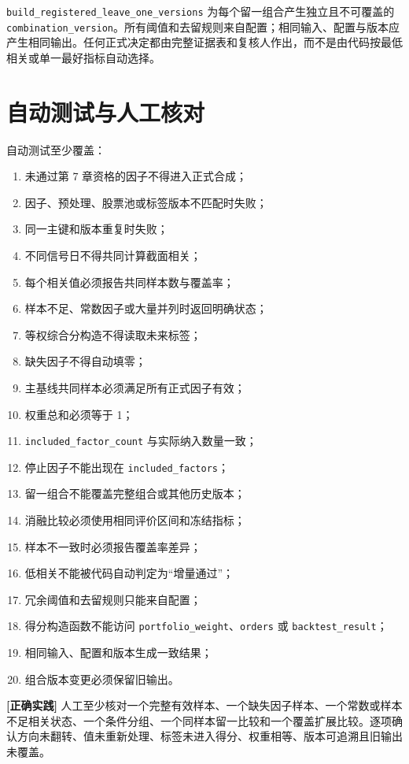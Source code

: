 \texttt{build\_registered\_leave\_one\_versions} 为每个留一组合产生独立且不可覆盖的 \texttt{combination\_version}。所有阈值和去留规则来自配置；相同输入、配置与版本应产生相同输出。任何正式决定都由完整证据表和复核人作出，而不是由代码按最低相关或单一最好指标自动选择。

\section{自动测试与人工核对}

自动测试至少覆盖：

\begin{enumerate}
  \item 未通过第 7 章资格的因子不得进入正式合成；
  \item 因子、预处理、股票池或标签版本不匹配时失败；
  \item 同一主键和版本重复时失败；
  \item 不同信号日不得共同计算截面相关；
  \item 每个相关值必须报告共同样本数与覆盖率；
  \item 样本不足、常数因子或大量并列时返回明确状态；
  \item 等权综合分构造不得读取未来标签；
  \item 缺失因子不得自动填零；
  \item 主基线共同样本必须满足所有正式因子有效；
  \item 权重总和必须等于 1；
  \item \texttt{included\_factor\_count} 与实际纳入数量一致；
  \item 停止因子不能出现在 \texttt{included\_factors}；
  \item 留一组合不能覆盖完整组合或其他历史版本；
  \item 消融比较必须使用相同评价区间和冻结指标；
  \item 样本不一致时必须报告覆盖率差异；
  \item 低相关不能被代码自动判定为“增量通过”；
  \item 冗余阈值和去留规则只能来自配置；
  \item 得分构造函数不能访问 \texttt{portfolio\_weight}、\texttt{orders} 或 \texttt{backtest\_result}；
  \item 相同输入、配置和版本生成一致结果；
  \item 组合版本变更必须保留旧输出。
\end{enumerate}

\begin{practicebox}
\textbf{[正确实践]} 人工至少核对一个完整有效样本、一个缺失因子样本、一个常数或样本不足相关状态、一个条件分组、一个同样本留一比较和一个覆盖扩展比较。逐项确认方向未翻转、值未重新处理、标签未进入得分、权重相等、版本可追溯且旧输出未覆盖。
\end{practicebox}

